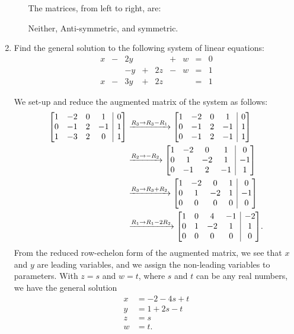 \documentclass[12pt]{article}
\makeatletter
\newenvironment{amatrix}[1]{%
  \left[\begin{array}{@{}*{#1}{c}|c@{}}
}{%
  \end{array}\right]
}
\newcommand{\points}[1]{\marginpar{\hspace{24pt}[#1]}}
\makeatother
\begin{document}
\begin{enumerate}
\begin{enumerate}
\bigskip

 The matrices, from left to right, are:

Neither, Anti-symmetric, and symmetric.

\bigskip


\end{enumerate}
\newpage

\item Find the general solution to the following system of linear equations: \points{10}
\[
\begin{array}{ccccccccc}
x&-&2y& &  &+&w&=&0\\
 & &-y&+&2z&-&w&=&1\\
x&-&3y&+&2z& & &=&1 
\end{array}
\]

\bigskip

 We set-up and reduce the augmented matrix of the system as follows:
\begin{align*}
 \begin{amatrix}{4}
  1&-2&0&1&0\\0&-1&2&-1&1\\1&-3&2&0&1
 \end{amatrix}&\xrightarrow[]{R_3\to R_3-R_1}\begin{amatrix}{4}1&-2&0&1&0\\0&-1&2&-1&1\\0&-1&2&-1&1\end{amatrix}\\
&\xrightarrow[]{R_2\to -R_2}\begin{amatrix}{4}
                             1&-2&0&1&0\\0&1&-2&1&-1\\0&-1&2&-1&1
                            \end{amatrix}\\
&\xrightarrow[]{R_3\to R_3+R_2}\begin{amatrix}{4}
                                1&-2&0&1&0\\0&1&-2&1&-1\\0&0&0&0&0
                               \end{amatrix}\\
&\xrightarrow[]{R_1\to R_1-2R_2}\begin{amatrix}{4}
                                 1&0&4&-1&-2\\0&1&-2&1&1\\0&0&0&0&0
                                \end{amatrix}.
\end{align*}
From the reduced row-echelon form of the augmented matrix, we see that $x$ and $y$ are leading variables, and we assign the non-leading variables to parameters. With $z=s$ and $w=t$, where $s$ and $t$ can be any real numbers, we have the general solution
\begin{align*}
 x& = -2-4s+t\\
 y& = 1+2s-t\\
 z&=s\\
 w&=t.
\end{align*}



\end{enumerate}
\end{document}
